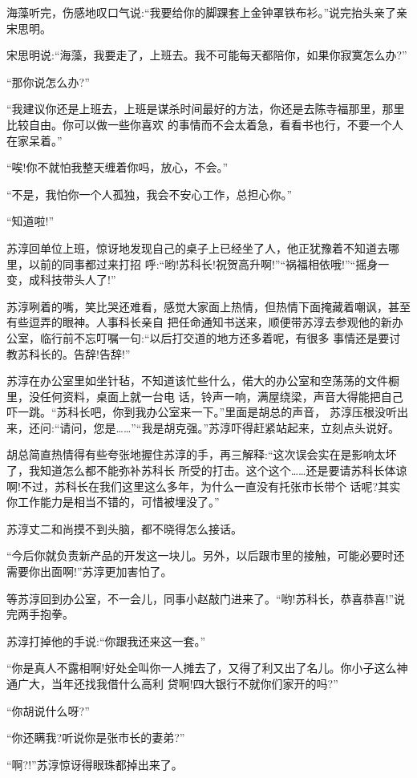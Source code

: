 \documentclass[11pt,a4paper,onecolumn]{article}
\begin{document}
海藻听完，伤感地叹口气说:``我要给你的脚踝套上金钟罩铁布衫。''说完抬头亲了亲宋思明。

宋思明说:``海藻，我要走了，上班去。我不可能每天都陪你，如果你寂寞怎么办?''

``那你说怎么办?''

``我建议你还是上班去，上班是谋杀时间最好的方法，你还是去陈寺福那里，那里比较自由。你可以做一些你喜欢
的事情而不会太着急，看看书也行，不要一个人在家呆着。''

``唉!你不就怕我整天缠着你吗，放心，不会。''

``不是，我怕你一个人孤独，我会不安心工作，总担心你。''

``知道啦!''

苏淳回单位上班，惊讶地发现自己的桌子上已经坐了人，他正犹豫着不知道去哪里，以前的同事都过来打招
呼:``哟!苏科长!祝贺高升啊!''``祸福相依哦!''``摇身一变，成科技带头人了!''

苏淳咧着的嘴，笑比哭还难看，感觉大家面上热情，但热情下面掩藏着嘲讽，甚至有些逗弄的眼神。人事科长亲自
把任命通知书送来，顺便带苏淳去参观他的新办公室，临行前不忘叮嘱一句:``以后打交道的地方还多着呢，有很多
事情还是要讨教苏科长的。告辞!告辞!''

苏淳在办公室里如坐针毡，不知道该忙些什么，偌大的办公室和空荡荡的文件橱里，没任何资料，桌面上就一台电
话，铃声一响，满屋绕梁，声音大得能把自己吓一跳。``苏科长吧，你到我办公室来一下。''里面是胡总的声音，
苏淳压根没听出来，还问:``请问，您是……''``我是胡克强。''苏淳吓得赶紧站起来，立刻点头说好。

胡总简直热情得有些夸张地握住苏淳的手，再三解释:``这次误会实在是影响太坏了，我知道怎么都不能弥补苏科长
所受的打击。这个这个……还是要请苏科长体谅啊!不过，苏科长在我们这里这么多年，为什么一直没有托张市长带个
话呢?其实你工作能力是相当不错的，可惜被埋没了。''

苏淳丈二和尚摸不到头脑，都不晓得怎么接话。

``今后你就负责新产品的开发这一块儿。另外，以后跟市里的接触，可能必要时还需要你出面啊!''苏淳更加害怕了。

等苏淳回到办公室，不一会儿，同事小赵敲门进来了。``哟!苏科长，恭喜恭喜!''说完两手抱拳。

苏淳打掉他的手说:``你跟我还来这一套。''

``你是真人不露相啊!好处全叫你一人摊去了，又得了利又出了名儿。你小子这么神通广大，当年还找我借什么高利
贷啊!四大银行不就你们家开的吗?''

``你胡说什么呀?''

``你还瞒我?听说你是张市长的妻弟?''

``啊?!''苏淳惊讶得眼珠都掉出来了。
\end{document}
